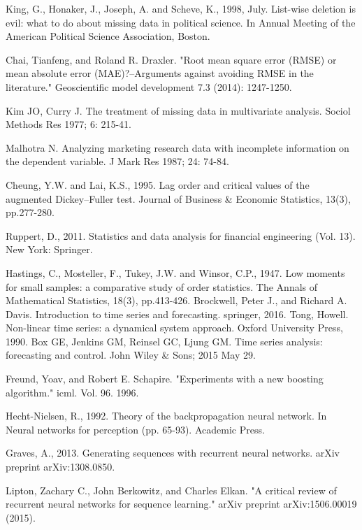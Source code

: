 \documentclass[11pt]{report}           %
\begin{document}
\begin{thebibliography}{80}
 King, G., Honaker, J., Joseph, A. and Scheve, K., 1998, July. List-wise deletion is evil: what to do about missing data in political science. In Annual Meeting of the American Political Science Association, Boston.

Chai, Tianfeng, and Roland R. Draxler. "Root mean square error (RMSE) or mean absolute error (MAE)?–Arguments against avoiding RMSE in the literature." Geoscientific model development 7.3 (2014): 1247-1250.

Kim JO, Curry J. The treatment of missing data in multivariate
analysis. Sociol Methods Res 1977; 6: 215-41.

 Malhotra N. Analyzing marketing research data with incomplete information on the dependent variable. J Mark Res 1987; 24: 74-84.
 
 Cheung, Y.W. and Lai, K.S., 1995. Lag order and critical values of the augmented Dickey–Fuller test. Journal of Business & Economic Statistics, 13(3), pp.277-280.
 
 Ruppert, D., 2011. Statistics and data analysis for financial engineering (Vol. 13). New York: Springer.


 Hastings, C., Mosteller, F., Tukey, J.W. and Winsor, C.P., 1947. Low moments for small samples: a comparative study of order statistics. The Annals of Mathematical Statistics, 18(3), pp.413-426.
 Brockwell, Peter J., and Richard A. Davis. Introduction to time series and forecasting. springer, 2016.
 Tong, Howell. Non-linear time series: a dynamical system approach. Oxford University Press, 1990.
 Box GE, Jenkins GM, Reinsel GC, Ljung GM. Time series analysis: forecasting and control. John Wiley & Sons; 2015 May 29.
 
 Freund, Yoav, and Robert E. Schapire. "Experiments with a new boosting algorithm." icml. Vol. 96. 1996.
 
 Hecht-Nielsen, R., 1992. Theory of the backpropagation neural network. In Neural networks for perception (pp. 65-93). Academic Press.
 
 
 Graves, A., 2013. Generating sequences with recurrent neural networks. arXiv preprint arXiv:1308.0850.
 
 Lipton, Zachary C., John Berkowitz, and Charles Elkan. "A critical review of recurrent neural networks for sequence learning." arXiv preprint arXiv:1506.00019 (2015).
 

\end{thebibliography}
\end{document}

